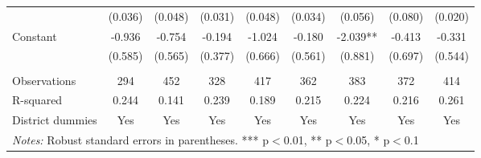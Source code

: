 \documentclass[11pt]{article}
\begin{document}
\begin{landscape}
\begin{table}[H]
{\begin{tabularx}{1.8\linewidth}{lcccccccc}
 & (0.036) & (0.048) & (0.031) & (0.048) & (0.034) & (0.056) & (0.080) & (0.020) \\
Constant & -0.936 & -0.754 & -0.194 & -1.024 & -0.180 & -2.039** & -0.413 & -0.331 \\
 & (0.585) & (0.565) & (0.377) & (0.666) & (0.561) & (0.881) & (0.697) & (0.544) \\
 &  &  &  &  &  &  &  &  \\
Observations & 294 & 452 & 328 & 417 & 362 & 383 & 372 & 414 \\
R-squared & 0.244 & 0.141 & 0.239 & 0.189 & 0.215 & 0.224 & 0.216 & 0.261 \\
 District dummies & Yes & Yes & Yes & Yes & Yes & Yes & Yes & Yes \\ \hline
\multicolumn{9}{l}{\textit{Notes:} Robust standard errors in parentheses. *** p$<$0.01, ** p$<$0.05, * p$<$0.1} \\
  \end{tabularx}}
\end{table}
\doublespacing

\end{landscape}

\newpage

\end{document}

